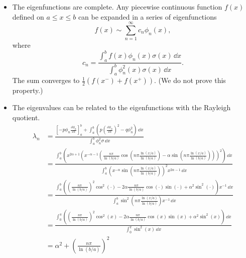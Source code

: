 {\begin{Solution}
\begin{itemize}
\begin{align*}
      &= \frac{\ln(b/a)}{2\pi} \int_0^\pi 
      \left( \cos((n-m) x) - \cos((n+m) x) \right) \,\dd x \\
      &= 0 \quad \mathrm{if}\ n \neq m
    \end{align*}
  \item   
    The eigenfunctions are complete.  Any piecewise continuous function
    $f(x)$ defined on $a \leq x \leq b$ can be expanded in a series of 
    eigenfunctions
    \[ 
    f(x) \sim \sum_{n = 1}^\infty c_n \phi_n(x),
    \]
    where
    \[ 
    c_n = \frac{\int_a^b f(x) \phi_n(x) \sigma(x)\,\dd x}
    {\int_a^b \phi_n^2(x) \sigma(x)\,\dd x}.
    \]
    The sum converges to $\frac{1}{2}(f(x^-) + f(x^+))$.
    (We do not prove this property.)
  \item   
    The eigenvalues can be related to the eigenfunctions with 
    the Rayleigh quotient.
    \begin{align*} 
      \lambda_n 
      &= \frac{ \left[ - p \phi_n \frac{\dd \phi_n}{\dd x} \right]_a^b + \int_a^b
        \left( p \left(\frac{\dd \phi_n}{\dd x}\right)^2-q\phi_n^2
        \right)\,\dd x}
      {\int_a^b \phi_n^2 \sigma\,\dd x} \\
      &= \frac{ \int_a^b \left( x^{2 \alpha + 1}
          \left( 
            x^{-\alpha-1} \left( \frac{n \pi}{\ln(b/a)}
              \cos \left( n \pi \frac{ \ln(x/a) }{ \ln(b/a) } \right)
              - \alpha 
              \sin \left( n \pi \frac{ \ln(x/a) }{ \ln(b/a) }\right)\right)
          \right)^2
        \right)\,\dd x}
      {\int_a^b \left( 
          x^{-\alpha}
          \sin \left( n \pi \frac{ \ln(x/a) }{ \ln(b/a) } \right)
        \right)^2 
        x^{2 \alpha - 1} \,\dd x} \\
      &= \frac{ \int_a^b \left(
          \left( \frac{n \pi}{\ln(b/a)} \right)^2
          \cos^2 \left( \cdot \right)
          - 2 \alpha \frac{n \pi}{\ln(b/a)} 
          \cos \left( \cdot \right)
          \sin \left( \cdot \right)
          + \alpha^2 
          \sin^2 \left( \cdot\right)
        \right) x^{-1} \,\dd x}
      {\int_a^b
        \sin^2 \left( n \pi \frac{ \ln(x/a) }{ \ln(b/a) } \right)
        x^{-1} \,\dd x} \\
      &= \frac{ \int_0^\pi \left( 
          \left( \frac{n \pi}{\ln(b/a)} \right)^2 \cos^2(x)
          -2 \alpha \frac{n \pi}{\ln(b/a)} \cos(x) \sin(x)
          + \alpha^2 \sin^2(x)
        \right)\,\dd x}
      {\int_0^\pi \sin^2(x) \,\dd x} \\
      &= \alpha^2 + \left( \frac{n \pi}{\ln(b/a)} \right)^2
    \end{align*}
  \end{itemize}


\end{Solution}}
